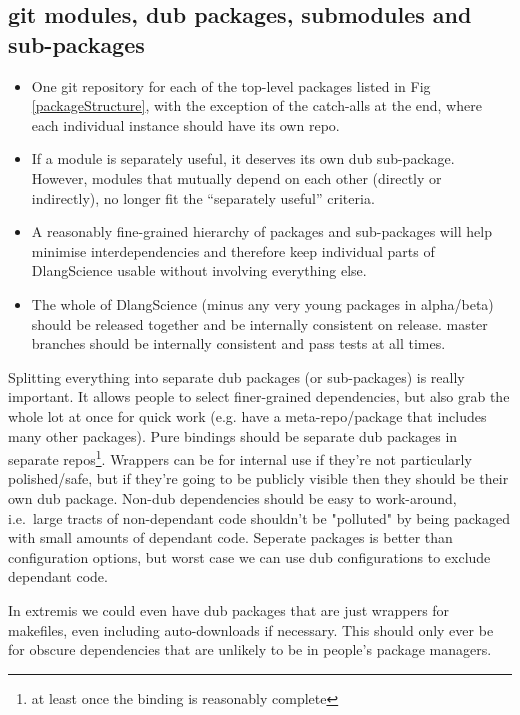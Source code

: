 \documentclass[10pt,a5paper,DIV=13]{scrartcl}
\begin{document}
\subsection{git modules, dub packages, submodules and sub-packages}
\begin{itemize}
    \item One git repository for each of the top-level packages listed in Fig \ref{packageStructure}, with the exception of the catch-alls at the end, where each individual instance should have its own repo.
    \item If a module is separately useful, it deserves its own dub sub-package. However, modules that mutually depend on each other (directly or indirectly), no longer fit the ``separately useful'' criteria.    
    \item A reasonably fine-grained hierarchy of packages and sub-packages will help minimise interdependencies and therefore keep individual parts of DlangScience usable without involving everything else.
    \item The whole of DlangScience (minus any very young packages in alpha/beta) should be released together and be internally consistent on release. master branches should be internally consistent and pass tests at all times.
\end{itemize}

Splitting everything into separate dub packages (or sub-packages) is really important. It allows people to select finer-grained dependencies, but also grab the whole lot at once for quick work (e.g. have a meta-repo/package that includes many other packages). Pure bindings should be separate dub packages in separate repos\footnote{at least once the binding is reasonably complete}. Wrappers can be for internal use if they're not particularly polished/safe, but if they're going to be publicly visible then they should be their own dub package. Non-dub dependencies should be easy to work-around, i.e.\ large tracts of non-dependant code shouldn't be "polluted" by being packaged with small amounts of dependant code. Seperate packages is better than configuration options, but worst case we can use dub configurations to exclude dependant code.

In extremis we could even have dub packages that are just wrappers for makefiles, even including auto-downloads if necessary. This should only ever be for obscure dependencies that are unlikely to be in people's package managers.
\end{document}
